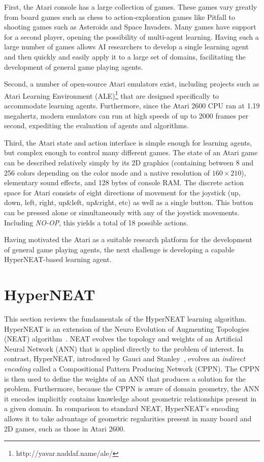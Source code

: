 \documentclass{sig-alternate}
\begin{document}
First, the Atari console has a large collection of games. These games vary greatly from board games such as chess to action-exploration games like Pitfall to shooting games such as Asteroids and Space Invaders. Many games have support for a second player, opening the possibility of multi-agent learning. Having such a large number of games allows AI researchers to develop a single learning agent and then quickly and easily apply it to a large set of domains, facilitating the development of general game playing agents.

Second, a number of open-source Atari emulators exist, including projects such as Atari Learning Environment (ALE)\footnote{http://yavar.naddaf.name/ale/} that are designed specifically to accommodate learning agents. Furthermore, since the Atari 2600 CPU ran at 1.19 megahertz, modern emulators can run at high speeds of up to 2000 frames per second, expediting the evaluation of agents and algorithms.

Third, the Atari state and action interface is simple enough for learning agents, but complex enough to control many different games. The state of an Atari game can be described relatively simply by its 2D graphics (containing between 8 and 256 colors depending on the color mode and a native resolution of $160\times 210$), elementary sound effects, and 128 bytes of console RAM. The discrete action space for Atari consists of eight directions of movement for the joystick (up, down, left, right, up\&left, up\&right, etc) as well as a single button. This button can be pressed alone or simultaneously with any of the joystick movements. Including \textit{NO-OP}, this yields a total of 18 possible actions.

Having motivated the Atari as a suitable research platform for the development of general game playing agents, the next challenge is developing a capable HyperNEAT-based learning agent.

\section{HyperNEAT}
\label{sec:hyperneat}
This section reviews the fundamentals of the HyperNEAT learning algorithm. HyperNEAT is an extension of the Neuro Evolution of Augmenting Topologies (NEAT) algorithm~\cite{stanley02}. NEAT evolves the topology and weights of an Artificial Neural Network (ANN) that is applied directly to the problem of interest. In contrast, HyperNEAT, introduced by Gauci and Stanley~\cite{gauci08}, evolves an \emph{indirect encoding} called a Compositional Pattern Producing Network (CPPN). The CPPN is then used to define the weights of an ANN that produces a solution for the problem. Furthermore, because the CPPN is aware of domain geometry, the ANN it encodes implicitly contains knowledge about geometric relationships present in a given domain. In comparison to standard NEAT, HyperNEAT's encoding allows it to take advantage of geometric regularities present in many board and 2D games, such as those in Atari 2600. 
\end{document}
